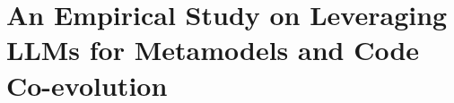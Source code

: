 
\chapter{An Empirical Study on Leveraging LLMs for Metamodels and Code Co-evolution}
\label{chapitre3}
